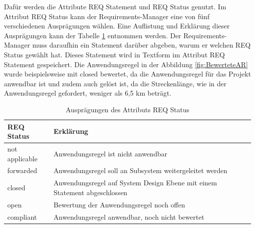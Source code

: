 Dafür werden die Attribute REQ Statement und REQ Status genutzt. Im Attribut REQ Status kann der Requirements-Manager eine von fünf verschiedenen
Ausprägungen wählen. Eine Auflistung und Erklärung dieser Ausprägungen kann der Tabelle \ref*{tab:REQStatus} entnommen werden. Der 
Requirements-Manager muss daraufhin ein Statement darüber abgeben, warum er welchen REQ Status gewählt hat. Dieses Statement wird in Textform im
Attribut REQ Statement gespeichert. Die Anwendungsregel in der Abbildung \ref*{fig:BewerteteAR} wurde beispielsweise mit closed bewertet,
da die Anwendungsregel für das Projekt anwendbar ist und zudem auch gelöst ist, da die Streckenlänge, wie in der Anwendungsregel gefordert,
weniger als 6,5 km beträgt.

\begin{table}[H]
    \begin{center}
        \caption{Ausprägungen des Attributs REQ Status \cite[vgl. S.28f.]{SMO-AR}}
        \label{tab:REQStatus}
        \begin{tabularx}{\textwidth}{|l|>{\raggedright\arraybackslash}X |}
            \hline
            \textbf{REQ Status} & \textbf{Erklärung}\\ \hline
            not applicable & Anwendungsregel ist nicht anwendbar \\ \hline
            forwarded & Anwendungsregel soll an Subsystem weitergeleitet werden \\ \hline
            closed & Anwendungsregel auf System Design Ebene mit einem Statement abgeschlossen \\ \hline
            open &  Bewertung der Anwendungsregel noch offen \\ \hline
            compliant & Anwendungsregel anwendbar, noch nicht bewertet \\ \hline
        \end{tabularx}
    \end{center}
\end{table}